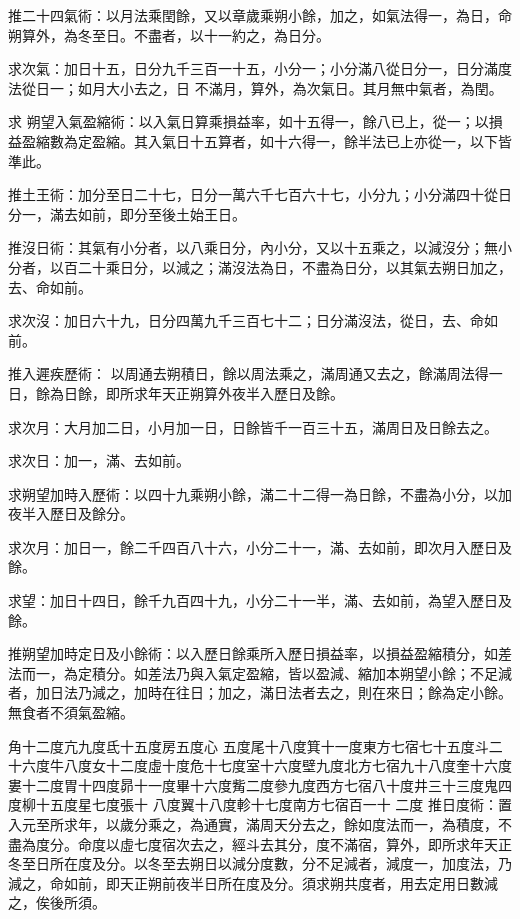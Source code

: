 \begin{pinyinscope}
 推二十四氣術：以月法乘閏餘，又以章歲乘朔小餘，加之，如氣法得一，為日，命朔算外，為冬至日。不盡者，以十一約之，為日分。



 求次氣：加日十五，日分九千三百一十五，小分一；小分滿八從日分一，日分滿度法從日一；如月大小去之，日
 不滿月，算外，為次氣日。其月無中氣者，為閏。



 求
 朔望入氣盈縮術：以入氣日算乘損益率，如十五得一，餘八已上，從一；以損益盈縮數為定盈縮。其入氣日十五算者，如十六得一，餘半法已上亦從一，以下皆準此。



 推土王術：加分至日二十七，日分一萬六千七百六十七，小分九；小分滿四十從日分一，滿去如前，即分至後土始王日。



 推沒日術：其氣有小分者，以八乘日分，內小分，又以十五乘之，以減沒分；無小分者，以百二十乘日分，以減之；滿沒法為日，不盡為日分，以其氣去朔日加之，去、命如前。



 求次沒：加日六十九，日分四萬九千三百七十二；日分滿沒法，從日，去、命如前。



 推入遲疾歷術：
 以周通去朔積日，餘以周法乘之，滿周通又去之，餘滿周法得一日，餘為日餘，即所求年天正朔算外夜半入歷日及餘。



 求次月：大月加二日，小月加一日，日餘皆千一百三十五，滿周日及日餘去之。



 求次日：加一，滿、去如前。



 求朔望加時入歷術：以四十九乘朔小餘，滿二十二得一為日餘，不盡為小分，以加夜半入歷日及餘分。



 求次月：加日一，餘二千四百八十六，小分二十一，滿、去如前，即次月入歷日及餘。



 求望：加日十四日，餘千九百四十九，小分二十一半，滿、去如前，為望入歷日及餘。



 推朔望加時定日及小餘術：以入歷日餘乘所入歷日損益率，以損益盈縮積分，如差法而一，為定積分。如差法乃與入氣定盈縮，皆以盈減、縮加本朔望小餘；不足減者，加日法乃減之，加時在往日；加之，滿日法者去之，則在來日；餘為定小餘。無食者不須氣盈縮。



 角十二度亢九度氐十五度房五度心
 五度尾十八度箕十一度東方七宿七十五度斗二十六度牛八度女十二度虛十度危十七度室十六度壁九度北方七宿九十八度奎十六度婁十二度胃十四度昴十一度畢十六度觜二度參九度西方七宿八十度井三十三度鬼四度柳十五度星七度張十
 八度翼十八度軫十七度南方七宿百一十
 二度
 推日度術：置入元至所求年，以歲分乘之，為通實，滿周天分去之，餘如度法而一，為積度，不盡為度分。命度以虛七度宿次去之，經斗去其分，度不滿宿，算外，即所求年天正冬至日所在度及分。以冬至去朔日以減分度數，分不足減者，減度一，加度法，乃減之，命如前，即天正朔前夜半日所在度及分。須求朔共度者，用去定用日數減之，俟後所須。




\end{pinyinscope}
